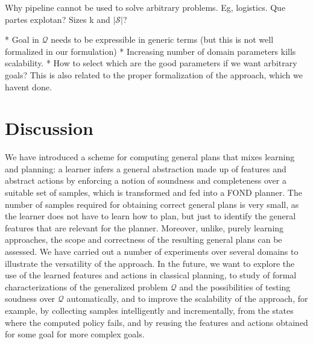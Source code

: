 \documentclass[letterpaper]{article} %
\newcommand{\Omit}[1]{}
\newcommand{\abs}[1]{\ensuremath{\left\vert{#1}\right\vert}}
\newcommand{\Q}{\mathcal{Q}}
\begin{document}
\begin{enumerate}
Why pipeline cannot be used to solve arbitrary problems. Eg, logistics.
Que partes explotan? Sizes k and $\abs{\mathcal{S}}$?

* Goal in $\Q$ needs to be expressible in generic terms (but this is not well formalized in our formulation)
* Increasing number of domain parameters kills scalability.
* How to select which are the good parameters if we want arbitrary goals? This is also related to the proper formalization
  of the approach, which we havent done.



\end{enumerate}


\section{Discussion}

We have introduced a scheme for computing general plans that mixes
learning and planning: a learner infers a general abstraction made
up of features and abstract actions by enforcing a notion of soundness
and completeness over a suitable set of samples, which is transformed
and fed into a FOND planner.
The number of samples required for obtaining correct general plans is
very small, as the learner does not have to learn how to plan, but
just to identify the general features that are relevant for the planner.
Moreover, unlike, purely learning approaches, the scope and correctness
of the resulting general plans can be assessed.
We have carried out a number of experiments over several domains to 
illustrate the versatility of the approach. In the future, we want to
explore the use of the learned features and actions in classical
planning, to study of formal characterizations of the generalized
problem $\Q$ and the possibilities of testing soudness over $\Q$
automatically, and to improve the scalability of the approach,
for example, by collecting samples intelligently and incrementally,
from the states where the computed policy fails, and by reusing the
features and actions obtained for some goal for more complex goals.

\Omit{
** discussion  of experiments; things we do well and not, scope, lessons. limitations (expressive? scalability?)
** briefly related work, expanding paragraph in intro.
** summary and cconlusions
}



\end{document}
